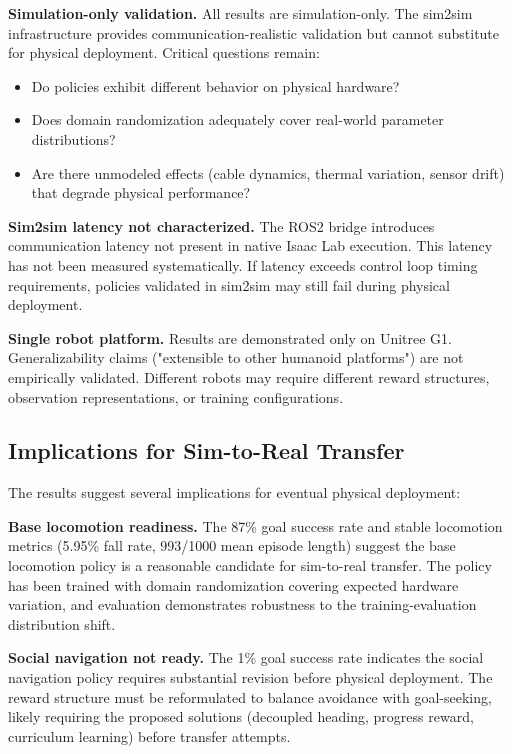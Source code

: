 \documentclass[12pt,a4paper]{article}
\begin{document}
\textbf{Simulation-only validation.} All results are simulation-only. The sim2sim infrastructure provides communication-realistic validation but cannot substitute for physical deployment. Critical questions remain:
\begin{itemize}
    \item Do policies exhibit different behavior on physical hardware?
    \item Does domain randomization adequately cover real-world parameter distributions?
    \item Are there unmodeled effects (cable dynamics, thermal variation, sensor drift) that degrade physical performance?
\end{itemize}

\textbf{Sim2sim latency not characterized.} The ROS2 bridge introduces communication latency not present in native Isaac Lab execution. This latency has not been measured systematically. If latency exceeds control loop timing requirements, policies validated in sim2sim may still fail during physical deployment.

\textbf{Single robot platform.} Results are demonstrated only on Unitree G1. Generalizability claims ("extensible to other humanoid platforms") are not empirically validated. Different robots may require different reward structures, observation representations, or training configurations.

\subsection{Implications for Sim-to-Real Transfer}

The results suggest several implications for eventual physical deployment:

\textbf{Base locomotion readiness.} The 87\% goal success rate and stable locomotion metrics (5.95\% fall rate, 993/1000 mean episode length) suggest the base locomotion policy is a reasonable candidate for sim-to-real transfer. The policy has been trained with domain randomization covering expected hardware variation, and evaluation demonstrates robustness to the training-evaluation distribution shift.

\textbf{Social navigation not ready.} The 1\% goal success rate indicates the social navigation policy requires substantial revision before physical deployment. The reward structure must be reformulated to balance avoidance with goal-seeking, likely requiring the proposed solutions (decoupled heading, progress reward, curriculum learning) before transfer attempts.
\end{document}
